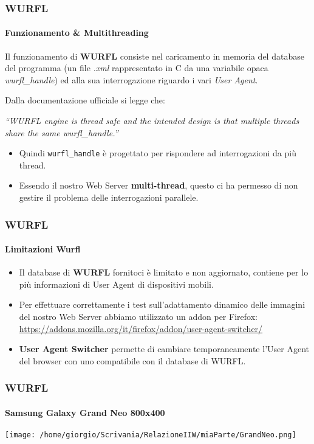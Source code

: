 \documentclass{beamer}
\begin{document}
\begin{frame}
\frametitle{WURFL}
\framesubtitle{Funzionamento \& Multithreading}

Il funzionamento di \textbf{WURFL} consiste nel caricamento in memoria del database del programma (un file \textit{.xml} rappresentato in C da una variabile opaca \textit{wurfl\_handle}) ed alla sua
interrogazione riguardo i vari \textit{User Agent}.

\medskip

Dalla documentazione ufficiale si legge che:

\medskip

\textit{ ``WURFL engine is thread safe and the intended design is that multiple
threads share the same wurfl\_handle.''}

\begin{itemize}
\item Quindi \texttt{wurfl\_handle} è progettato per rispondere ad interrogazioni da più thread.
\item Essendo il nostro Web Server \textbf{multi-thread}, questo ci ha permesso di non gestire  il problema delle interrogazioni parallele.
\end{itemize}


\end{frame}
\begin{frame}

\frametitle{WURFL}
\framesubtitle{Limitazioni Wurfl}

\begin{itemize}

\item Il database di \textbf{WURFL} fornitoci è limitato e non aggiornato, contiene per lo più informazioni di User Agent di dispositivi mobili.
\item Per effettuare correttamente i test sull'adattamento dinamico delle immagini del nostro Web Server abbiamo utilizzato un addon per Firefox: \href{https://addons.mozilla.org/it/firefox/addon/user-agent-switcher/}{\color{blue}  https://addons.mozilla.org/it/firefox/addon/user-agent-switcher/}
\item \textbf{User Agent Switcher} permette di cambiare temporaneamente l'User Agent del browser con uno compatibile con il database di WURFL.

\end{itemize}



\end{frame}
\begin{frame}
\frametitle{WURFL}
\framesubtitle{Samsung Galaxy Grand Neo 800x400}


\texttt{[image: /home/giorgio/Scrivania/RelazioneIIW/miaParte/GrandNeo.png]}



\end{frame}
\end{document}
